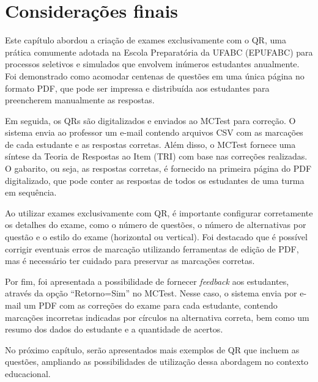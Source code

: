 
\section{Considerações finais}

Este capítulo abordou a criação de exames exclusivamente com o QR, uma prática comumente adotada na Escola Preparatória da UFABC (EPUFABC) para processos seletivos e simulados que envolvem inúmeros estudantes anualmente. Foi demonstrado como acomodar centenas de questões em uma única página no formato PDF, que pode ser impressa e distribuída aos estudantes para preencherem manualmente as respostas.

Em seguida, os QRs são digitalizados e enviados ao MCTest para correção. O sistema envia ao professor um e-mail contendo arquivos CSV com as marcações de cada estudante e as respostas corretas. Além disso, o MCTest fornece uma síntese da Teoria de Respostas ao Item (TRI) com base nas correções realizadas. O gabarito, ou seja, as respostas corretas, é fornecido na primeira página do PDF digitalizado, que pode conter as respostas de todos os estudantes de uma turma em sequência.

Ao utilizar exames exclusivamente com QR, é importante configurar corretamente os detalhes do exame, como o número de questões, o número de alternativas por questão e o estilo do exame (horizontal ou vertical). Foi destacado que é possível corrigir eventuais erros de marcação utilizando ferramentas de edição de PDF, mas é necessário ter cuidado para preservar as marcações corretas.

Por fim, foi apresentada a possibilidade de fornecer \textit{feedback} aos estudantes, através da opção ``Retorno=Sim'' no MCTest. Nesse caso, o sistema envia por e-mail um PDF com as correções do exame para cada estudante, contendo marcações incorretas indicadas por círculos na alternativa correta, bem como um resumo dos dados do estudante e a quantidade de acertos.

No próximo capítulo, serão apresentados mais exemplos de QR que incluem as questões, ampliando as possibilidades de utilização dessa abordagem no contexto educacional.


















